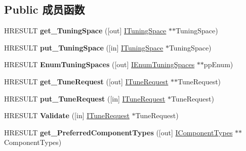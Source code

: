 \subsection*{Public 成员函数}
\begin{DoxyCompactItemize}
\item 
\mbox{\label{interface_i_tuner_aa6224d5b88213bc567bf6f3d5098d067}} 
H\+R\+E\+S\+U\+LT {\bfseries get\+\_\+\+Tuning\+Space} (\mbox{[}out\mbox{]} \hyperlink{interface_i_tuning_space}{I\+Tuning\+Space} $\ast$$\ast$Tuning\+Space)
\item 
\mbox{\label{interface_i_tuner_a4adee375505a974948e9e7b9bc602964}} 
H\+R\+E\+S\+U\+LT {\bfseries put\+\_\+\+Tuning\+Space} (\mbox{[}in\mbox{]} \hyperlink{interface_i_tuning_space}{I\+Tuning\+Space} $\ast$Tuning\+Space)
\item 
\mbox{\label{interface_i_tuner_a3080f0f1647d3bc13b134835683e1ee1}} 
H\+R\+E\+S\+U\+LT {\bfseries Enum\+Tuning\+Spaces} (\mbox{[}out\mbox{]} \hyperlink{interface_i_enum_tuning_spaces}{I\+Enum\+Tuning\+Spaces} $\ast$$\ast$pp\+Enum)
\item 
\mbox{\label{interface_i_tuner_a06f8b239df69e2acd447170559f69260}} 
H\+R\+E\+S\+U\+LT {\bfseries get\+\_\+\+Tune\+Request} (\mbox{[}out\mbox{]} \hyperlink{interface_i_tune_request}{I\+Tune\+Request} $\ast$$\ast$Tune\+Request)
\item 
\mbox{\label{interface_i_tuner_aa13e69cc08625a996567f4c72bb43eda}} 
H\+R\+E\+S\+U\+LT {\bfseries put\+\_\+\+Tune\+Request} (\mbox{[}in\mbox{]} \hyperlink{interface_i_tune_request}{I\+Tune\+Request} $\ast$Tune\+Request)
\item 
\mbox{\label{interface_i_tuner_a96673d63b39af7731307d4ff541c0022}} 
H\+R\+E\+S\+U\+LT {\bfseries Validate} (\mbox{[}in\mbox{]} \hyperlink{interface_i_tune_request}{I\+Tune\+Request} $\ast$Tune\+Request)
\item 
\mbox{\label{interface_i_tuner_aa1893d04d9520dec0ad1e6c9d5de9b9b}} 
H\+R\+E\+S\+U\+LT {\bfseries get\+\_\+\+Preferred\+Component\+Types} (\mbox{[}out\mbox{]} \hyperlink{interface_i_component_types}{I\+Component\+Types} $\ast$$\ast$Component\+Types)

\end{DoxyCompactItemize}
